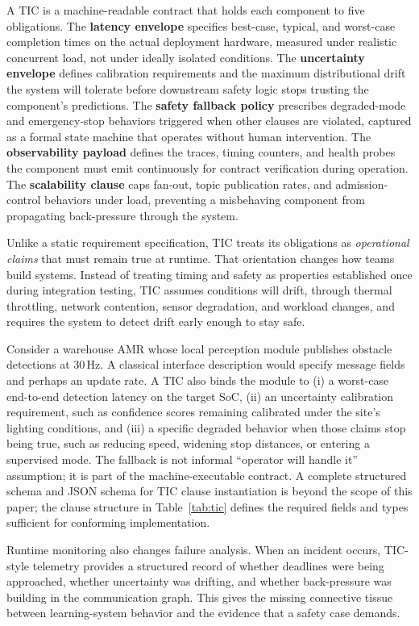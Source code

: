 \documentclass[smallextended]{svjour3}
\begin{document}
A TIC is a machine-readable contract that holds each component to five obligations. The \textbf{latency envelope} specifies best-case, typical, and worst-case completion times on the actual deployment hardware, measured under realistic concurrent load, not under ideally isolated conditions. The \textbf{uncertainty envelope} defines calibration requirements and the maximum distributional drift the system will tolerate before downstream safety logic stops trusting the component's predictions. The \textbf{safety fallback policy} prescribes degraded-mode and emergency-stop behaviors triggered when other clauses are violated, captured as a formal state machine that operates without human intervention. The \textbf{observability payload} defines the traces, timing counters, and health probes the component must emit continuously for contract verification during operation. The \textbf{scalability clause} caps fan-out, topic publication rates, and admission-control behaviors under load, preventing a misbehaving component from propagating back-pressure through the system.

Unlike a static requirement specification, TIC treats its obligations as \emph{operational claims} that must remain true at runtime. That orientation changes how teams build systems. Instead of treating timing and safety as properties established once during integration testing, TIC assumes conditions will drift, through thermal throttling, network contention, sensor degradation, and workload changes, and requires the system to detect drift early enough to stay safe.

Consider a warehouse AMR whose local perception module publishes obstacle detections at 30\,Hz. A classical interface description would specify message fields and perhaps an update rate. A TIC also binds the module to (i) a worst-case end-to-end detection latency on the target SoC, (ii) an uncertainty calibration requirement, such as confidence scores remaining calibrated under the site's lighting conditions, and (iii) a specific degraded behavior when those claims stop being true, such as reducing speed, widening stop distances, or entering a supervised mode. The fallback is not informal ``operator will handle it'' assumption; it is part of the machine-executable contract. A complete structured schema and
{JSON} schema for {TIC} clause instantiation is beyond the scope of this paper; the clause structure in Table~\ref{tab:tic} defines the required fields and types sufficient for conforming implementation.

Runtime monitoring also changes failure analysis. When an incident occurs, TIC-style telemetry provides a structured record of whether deadlines were being approached, whether uncertainty was drifting, and whether back-pressure was building in the communication graph. This gives the missing connective tissue between learning-system behavior and the evidence that a safety case demands.
\end{document}

